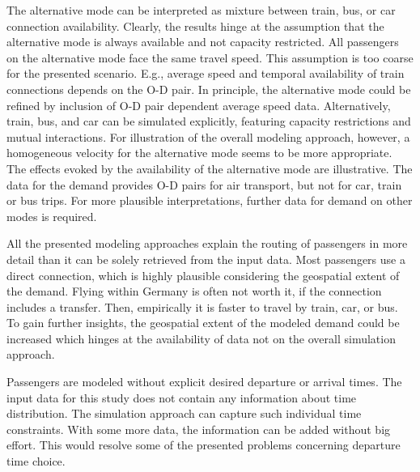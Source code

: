 The alternative mode can be interpreted as mixture between train, bus, or car connection availability. 
Clearly, the results hinge at the assumption that the alternative mode is always available and not capacity restricted.  
All passengers on the alternative mode face the same travel speed. 
This assumption is too coarse for the presented scenario. 
E.g., average speed and temporal availability of train connections depends on the O-D pair. 
In principle, the alternative mode could be refined by inclusion of O-D pair dependent average speed data. 
Alternatively, train, bus, and car can be simulated explicitly, featuring capacity restrictions and mutual interactions. 
For illustration of the overall modeling approach, however, a homogeneous velocity for the alternative mode seems to be more appropriate. 
The effects evoked by the availability of the alternative mode are illustrative. 
The data for the demand provides O-D pairs for air transport, but not for car, train or bus trips.  
For more plausible interpretations, further data for demand on other modes is required. 



All the presented modeling approaches explain the routing of passengers in more detail than it can be solely retrieved from the input data.  
Most passengers use a direct connection, which is highly plausible considering the geospatial extent of the demand.  
Flying within Germany is often not worth it, if the connection includes a transfer. 
Then, empirically it is faster to travel by train, car, or bus. 
To gain further insights, the geospatial extent of the modeled demand could be increased which hinges at the availability of data not on the overall simulation approach. 

Passengers are modeled without explicit desired departure or arrival times. 
The input data for this study does not contain any information about time distribution. 
The simulation approach can capture such individual time constraints.  
With some more data, the information can be added without big effort. 
This would resolve some of the presented problems concerning departure time choice. 

